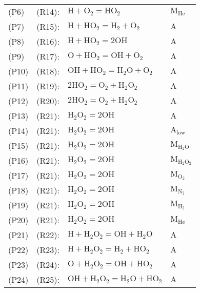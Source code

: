 \documentclass[preprint,3p,times,twocolumn]{elsarticle}
\begin{document}
\begin{itemize}
\begin{table}[htp]
\begin{tabular}{l r l l}
 (P6)& (R14): & $ \mathrm{H} + \mathrm{O}_2 = \mathrm{HO}_2     $&$ \mathrm{M}_{\mathrm{He}}$\\
 (P7)& (R15): & $ \mathrm{H} + \mathrm{HO}_2 = \mathrm{H}_2 + \mathrm{O}_2     $&$ \mathrm{A}$\\
 (P8)& (R16): & $ \mathrm{H} + \mathrm{HO}_2 = 2\mathrm{OH}     $&$ \mathrm{A}$\\
 (P9)& (R17): & $ \mathrm{O} + \mathrm{HO}_2 = \mathrm{OH} + \mathrm{O}_2     $&$ \mathrm{A}$\\
(P10)& (R18): & $ \mathrm{OH} + \mathrm{HO}_2 = \mathrm{H}_2\mathrm{O} + \mathrm{O}_2     $&$ \mathrm{A}$\\
(P11)& (R19): & $ 2\mathrm{HO}_2 = \mathrm{O}_2 + \mathrm{H}_2\mathrm{O}_2     $&$ \mathrm{A}$\\
(P12)& (R20): & $ 2\mathrm{HO}_2 = \mathrm{O}_2 + \mathrm{H}_2\mathrm{O}_2     $&$ \mathrm{A}$\\
(P13)& (R21): & $ \mathrm{H}_2\mathrm{O}_2 = 2\mathrm{OH}     $&$ \mathrm{A}$\\
(P14)& (R21): & $ \mathrm{H}_2\mathrm{O}_2 = 2\mathrm{OH}     $&$ \mathrm{A}_\mathrm{low}$\\
(P15)& (R21): & $ \mathrm{H}_2\mathrm{O}_2 = 2\mathrm{OH}     $&$ \mathrm{M}_{\mathrm{H}_2\mathrm{O}}$\\
(P16)& (R21): & $ \mathrm{H}_2\mathrm{O}_2 = 2\mathrm{OH}     $&$ \mathrm{M}_{\mathrm{H}_2\mathrm{O}_2}$\\
(P17)& (R21): & $ \mathrm{H}_2\mathrm{O}_2 = 2\mathrm{OH}     $&$ \mathrm{M}_{\mathrm{O}_2}$\\
(P18)& (R21): & $ \mathrm{H}_2\mathrm{O}_2 = 2\mathrm{OH}     $&$ \mathrm{M}_{\mathrm{N}_2}$\\
(P19)& (R21): & $ \mathrm{H}_2\mathrm{O}_2 = 2\mathrm{OH}     $&$ \mathrm{M}_{\mathrm{H}_2}$\\
(P20)& (R21): & $ \mathrm{H}_2\mathrm{O}_2 = 2\mathrm{OH}     $&$ \mathrm{M}_{\mathrm{He}}$\\
(P21)& (R22): & $ \mathrm{H} + \mathrm{H}_2\mathrm{O}_2 = \mathrm{OH} + \mathrm{H}_2\mathrm{O}     $&$ \mathrm{A}$\\
(P22)& (R23): & $ \mathrm{H} + \mathrm{H}_2\mathrm{O}_2 = \mathrm{H}_2 + \mathrm{HO}_2     $&$ \mathrm{A}$\\
(P23)& (R24): & $ \mathrm{O} + \mathrm{H}_2\mathrm{O}_2 = \mathrm{OH} + \mathrm{HO}_2     $&$ \mathrm{A}$\\
(P24)& (R25): & $ \mathrm{OH} + \mathrm{H}_2\mathrm{O}_2 = \mathrm{H}_2\mathrm{O} + \mathrm{HO}_2     $&$ \mathrm{A}$\\

\end{tabular}
\end{table}
\end{itemize}
\end{document}

